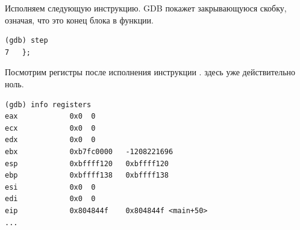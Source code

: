 Исполняем следующую инструкцию.
\ac{GDB} покажет закрывающуюся скобку, означая, что это конец блока в функции.

\begin{lstlisting}
(gdb) step
7	};
\end{lstlisting}

Посмотрим регистры после исполнения инструкции .
\EAX здесь уже действительно ноль.

\begin{lstlisting}
(gdb) info registers
eax            0x0	0
ecx            0x0	0
edx            0x0	0
ebx            0xb7fc0000	-1208221696
esp            0xbffff120	0xbffff120
ebp            0xbffff138	0xbffff138
esi            0x0	0
edi            0x0	0
eip            0x804844f	0x804844f <main+50>
...
\end{lstlisting}
\fi
\fi
